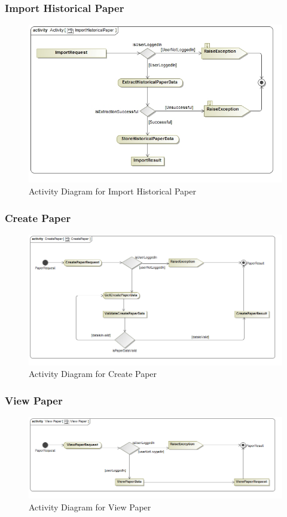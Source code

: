 \documentclass[a4paper,10pt]{article}
\begin{document}
\subsubsection{Import Historical Paper}
	\begin{figure}[h]
		\includegraphics[scale=0.5]{ActImportHistoricalPaper}
		\caption{Activity Diagram for Import Historical Paper}
	\end{figure}

	\subsubsection{Create Paper}
	\begin{figure}[h]
		\includegraphics[scale=0.5]{Activity_CreatePaper}
		\caption{Activity Diagram for Create Paper}
	\end{figure}

\subsubsection{View Paper}
	\begin{figure}[h]
		\includegraphics[scale=0.5]{Activity_ViewPaper}
		\caption{Activity Diagram for View Paper}
	\end{figure}
\end{document}
